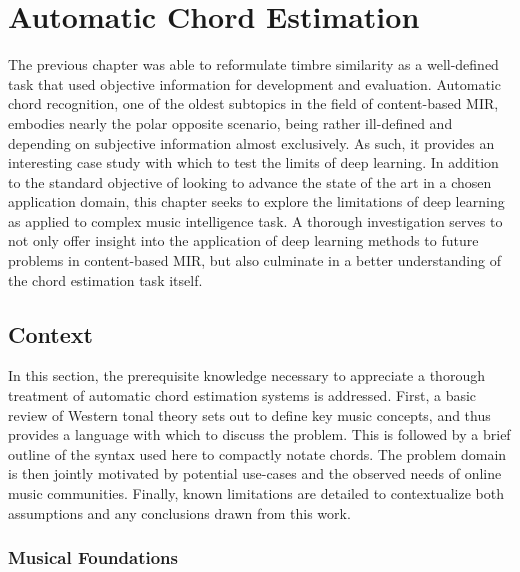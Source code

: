 \graphicspath{{5/figures/}}

\chapter{Automatic Chord Estimation}
\label{chp:chord_estimation}

The previous chapter was able to reformulate timbre similarity as a well-defined task that used objective information for development and evaluation.
Automatic chord recognition, one of the oldest subtopics in the field of content-based MIR, embodies nearly the polar opposite scenario, being rather ill-defined and depending on subjective information almost exclusively.
As such, it provides an interesting case study with which to test the limits of deep learning.
In addition to the standard objective of looking to advance the state of the art in a chosen application domain, this chapter seeks to explore the limitations of deep learning as applied to complex music intelligence task.
A thorough investigation serves to not only offer insight into the application of deep learning methods to future problems in content-based MIR, but also culminate in a better understanding of the chord estimation task itself.


\section{Context}
\label{sec:context}

In this section, the prerequisite knowledge necessary to appreciate a thorough treatment of automatic chord estimation systems is addressed.
First, a basic review of Western tonal theory sets out to define key music concepts, and thus provides a language with which to discuss the problem.
This is followed by a brief outline of the syntax used here to compactly notate chords.
The problem domain is then jointly motivated by potential use-cases and the observed needs of online music communities.
Finally, known limitations are detailed to contextualize both assumptions and any conclusions drawn from this work.



\subsection{Musical Foundations}
\label{subsec:musical_foundations}

